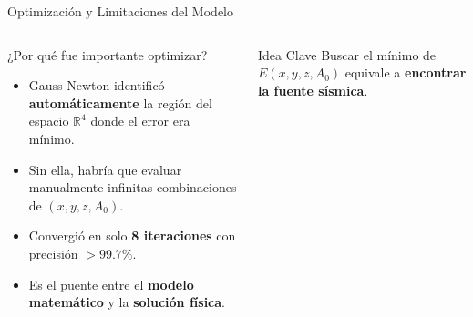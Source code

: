 

\begin{frame}{Optimización y Limitaciones del Modelo}

    \begin{columns}[T]


        \begin{block}{¿Por qué fue importante optimizar?}
            \scriptsize
            \begin{itemize}
                \item Gauss-Newton identificó \textbf{automáticamente} la región del espacio $\mathbb{R}^4$ donde el error era mínimo.
                \vspace{0.15cm}
                \item Sin ella, habría que evaluar manualmente infinitas combinaciones de $(x, y, z, A_0)$.
                \vspace{0.15cm}
                \item Convergió en solo \textbf{8 iteraciones} con precisión $> 99.7\%$.
                \vspace{0.15cm}
                \item Es el puente entre el \textbf{modelo matemático} y la \textbf{solución física}.
            \end{itemize}
        \end{block}

        \vspace{0.2cm}

        \begin{exampleblock}{Idea Clave}
            \centering
            \scriptsize
            Buscar el mínimo de $E(x,y,z,A_0)$ equivale a \textbf{encontrar la fuente sísmica}.
        \end{exampleblock}



\end{columns}
\end{frame}
